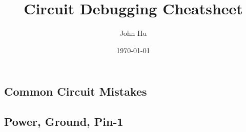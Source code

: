 \documentclass[10pt,letterpaper]{article}
\title{\color{w3schools}Circuit {\color{alert} Debugging} {\color{black} Cheatsheet}}
\author{John Hu}
\date{\today}
\begin{document}
\small
\begin{multicols}{3}

\maketitle
\thispagestyle{empty}
\scriptsize
\tableofcontents

\section{Common Circuit Mistakes}
\subsection{Power, Ground, Pin-1}





\AtNextBibliography{\footnotesize}
\printbibliography  
\end{multicols}
\end{document}
